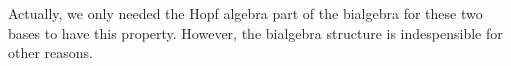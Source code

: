 Actually, we only needed the Hopf algebra part of the bialgebra for these two bases to have this property.  However, the bialgebra structure is indespensible for other reasons.
%
%
%

